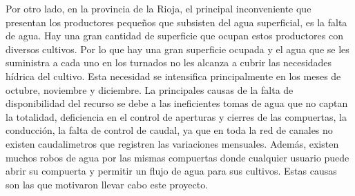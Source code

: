 Por otro lado, en la provincia de la Rioja, el principal inconveniente que presentan los productores pequeños que subsisten del agua superficial, es la falta de agua. Hay una gran cantidad de superficie que ocupan estos productores con diversos cultivos. Por lo que hay una gran superficie ocupada y el agua que se les suministra a cada uno en los turnados no les alcanza a cubrir las necesidades hídrica del cultivo. Esta necesidad se intensifica principalmente en los meses de octubre, noviembre y diciembre.
La principales causas de la falta de disponibilidad del recurso se debe a las ineficientes tomas de agua que no captan la totalidad, deficiencia en el control de aperturas y cierres de las compuertas, la conducción, la falta de control de caudal, ya que en toda la red de canales no existen caudalimetros que registren las variaciones mensuales. Además, existen muchos robos de agua por las mismas compuertas donde cualquier usuario puede abrir su compuerta y permitir un flujo de agua para sus cultivos.           
Estas causas son las que motivaron llevar cabo este proyecto.
%		
%
%
%
%

